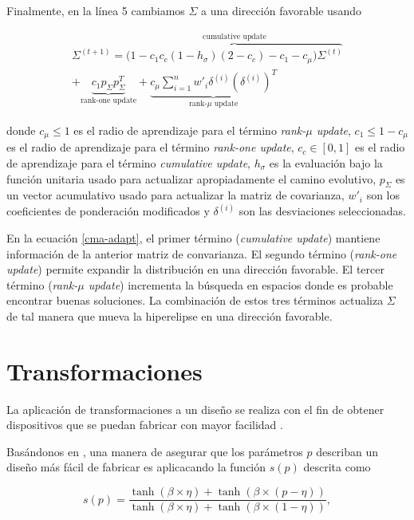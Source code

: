 Finalmente, en la línea 5 cambiamos $\Sigma$ a una dirección favorable usando

\begin{multline}
    \Sigma^{(t + 1)} = \overbrace{\bigg(1 - c_1 c_c (1 - h_{\sigma})(2 - c_c) - c_1 - c_{\mu}\bigg) \Sigma^{(t)}}^{\text{cumulative update}} \\
    + \underbrace{c_{1} p_{\Sigma} p_{\Sigma}^{T}}_{\text{rank-one update}} + \underbrace{c_{\mu}\sum_{i=1}^{n}w'_{i} \delta^{(i)}\left(\delta^{(i)}\right)^{T}}_{\text{rank-}\mu\text{ update}}
\label{cma-adapt}
\end{multline}

donde $c_{\mu} \leq 1$ es el radio de aprendizaje para el término \emph{rank-$\mu$ update}, 
$c_1 \leq 1 - c_{\mu}$ es el radio de aprendizaje para el término \emph{rank-one update}, 
$c_c \in [0, 1]$ es el radio de aprendizaje para el término \emph{cumulative update}, 
$h_{\sigma}$ es la evaluación bajo la función unitaria usado para actualizar
apropiadamente el camino evolutivo, 
$p_{\Sigma}$ es un vector acumulativo usado para actualizar la matriz de
covarianza, 
$w'_i$ son los coeficientes de ponderación modificados y
$\delta^{(i)}$ son las desviaciones seleccionadas.

En la ecuación \ref{cma-adapt}, el primer término (\emph{cumulative update}) 
mantiene información de la anterior matriz de convarianza.
El segundo término (\emph{rank-one update}) permite expandir la distribución en
una dirección favorable.
El tercer término (\emph{rank-$\mu$ update}) incrementa la búsqueda en espacios
donde es probable encontrar buenas soluciones.
La combinación de estos tres términos actualiza $\Sigma$ de tal manera que
mueva la hiperelipse en una dirección favorable.

\section{Transformaciones}

La aplicación de transformaciones a un diseño se realiza con el fin de obtener
dispositivos que se puedan fabricar con mayor facilidad \citep{Su2020}. 

Basándonos en \cite{Zhang2021}, una manera de asegurar que los
parámetros $p$ describan un diseño más fácil de fabricar es aplicacando la función $s(p)$
descrita como

\begin{equation}
  s(p) = \frac{\tanh (\beta \times \eta) + \tanh (\beta \times (p
  - \eta))}{\tanh (\beta \times \eta) + \tanh (\beta \times (1 - \eta))},
  \label{eq:topo-smooth}
\end{equation}

